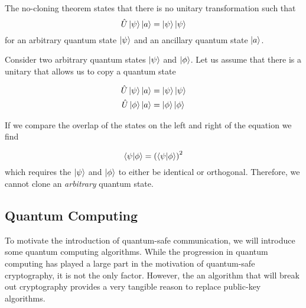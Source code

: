 
\begin{theorem}
	 The no-cloning theorem states that there is no unitary transformation such that
	 \begin{equation}
	 	\hat{U}\ket{\psi}\ket{a} = \ket{\psi}\ket{\psi}
	 \end{equation}
	 for an arbitrary quantum state $\ket{\psi}$ and an ancillary quantum state $\ket{a}$.
\end{theorem}

Consider two arbitrary quantum states $\ket{\psi}$ and $\ket{\phi}$. Let us assume that there is a unitary that allows us to copy a quantum state

\begin{align}
	\hat{U}\ket{\psi}\ket{a} &= \ket{\psi}\ket{\psi}\\
	\hat{U}\ket{\phi}\ket{a} &= \ket{\phi}\ket{\phi}
\end{align}

If we compare the overlap of the states on the left and right of the equation we find

\begin{equation}
	\braket{\psi|\phi} = \left(\braket{\psi|\phi}\right)^2
\end{equation}
which requires the $\ket{\psi}$ and $\ket{\phi}$ to either be identical or orthogonal. Therefore, we cannot clone an \emph{arbitrary} quantum state.

\subsection{Quantum Computing}

To motivate the introduction of quantum-safe communication, we will introduce some quantum computing algorithms. While the progression in quantum computing has played a large part in the motivation of quantum-safe cryptography, it is not the only factor. However, the an algorithm that will break out cryptography provides a very tangible reason to replace public-key algorithms.

